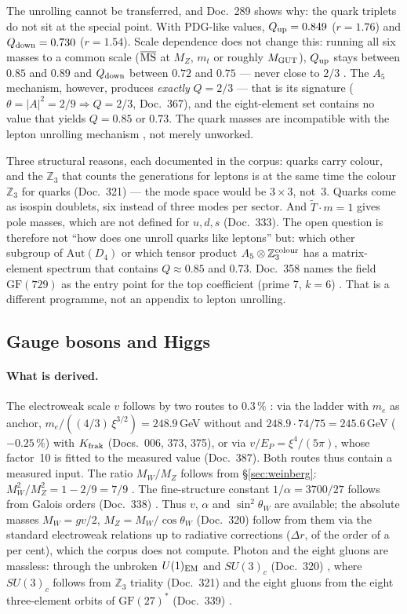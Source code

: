 The unrolling cannot be transferred, and Doc.~289 shows why: the quark
triplets do not sit at the special point. With PDG-like values,
$Q_{\rm up} = 0.849$ ($r = 1.76$) and $Q_{\rm down} = 0.730$ ($r = 1.54$).
Scale dependence does not change this: running all six masses to a common
scale ($\overline{\rm MS}$ at $M_Z$, $m_t$ or roughly $M_{\rm GUT}$),
$Q_{\rm up}$ stays between $0.85$ and $0.89$ and $Q_{\rm down}$ between $0.72$
and $0.75$ --- never close to $2/3$ \KM. The $A_5$ mechanism, however,
produces \emph{exactly} $Q = 2/3$ --- that is its signature
($\theta = |A|^2 = 2/9 \Rightarrow Q = 2/3$, Doc.~367), and the eight-element
set contains no value that yields $Q = 0.85$ or $0.73$. The quark masses are
incompatible with the lepton unrolling mechanism \XM, not merely unworked.

Three structural reasons, each documented in the corpus: quarks carry
colour, and the $\mathbb Z_3$ that counts the generations for leptons is at
the same time the colour $\mathbb Z_3$ for quarks (Doc.~321) --- the mode
space would be $3\times3$, not~3. Quarks come as isospin doublets, six
instead of three modes per sector. And $\tilde T\cdot m = 1$ gives pole
masses, which are not defined for $u,d,s$ (Doc.~333). The open question is
therefore not ``how does one unroll quarks like leptons'' but: which other
subgroup of $\mathrm{Aut}(D_4)$ or which tensor product
$A_5\otimes\mathbb Z_3^{\rm colour}$ has a matrix-element spectrum that
contains $Q\approx0.85$ and $0.73$. Doc.~358 names the field
$\mathrm{GF}(729)$ as the entry point for the top coefficient (prime 7,
$k=6$) \SM. That is a different programme, not an appendix to lepton
unrolling.

\subsection{Gauge bosons and Higgs}
\label{sec:bosonen}

\paragraph{What is derived.}
The electroweak scale $v$ follows by two routes to $0.3\,\%$ \KM: via the
ladder with $m_e$ as anchor, $m_e/((4/3)\,\xi^{3/2}) = 248.9$\,GeV without
and $248.9\cdot 74/75 = 245.6$\,GeV ($-0.25\,\%$) with $K_{\rm frak}$
(Docs.~006, 373, 375), or via $v/E_P = \xi^4/(5\pi)$, whose factor~10 is
fitted to the measured value (Doc.~387). Both routes thus contain a measured
input.
The ratio $M_W/M_Z$ follows from §\ref{sec:weinberg}:
$M_W^2/M_Z^2 = 1 - 2/9 = 7/9$ \KM. The fine-structure constant
$1/\alpha = 3700/27$ follows from Galois orders (Doc.~338) \KM. Thus $v$,
$\alpha$ and $\sin^2\theta_W$ are available; the absolute masses
$M_W = gv/2$, $M_Z = M_W/\cos\theta_W$ (Doc.~320) follow from them via the
standard electroweak relations up to radiative corrections ($\Delta r$, of
the order of a per cent), which the corpus does not compute. Photon and the
eight gluons are massless: through the unbroken $U(1)_{\rm EM}$ and
$SU(3)_c$ (Doc.~320) \BM, where $SU(3)_c$ follows from $\mathbb Z_3$
triality (Doc.~321) and the eight gluons from the eight three-element orbits
of $\mathrm{GF}(27)^*$ (Doc.~339) \BM.

